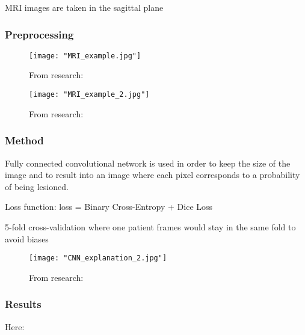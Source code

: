 MRI images are taken in the sagittal plane

\subsubsection{Preprocessing}

\begin{figure}[htbp]
	\centering
	\texttt{[image: "MRI\_example.jpg"]}
	\caption{From research: }
	\label{fig:res4:1}
\end{figure}

\begin{figure}[htbp]
	\centering
	\texttt{[image: "MRI\_example\_2.jpg"]}
	\caption{From research: }
	\label{fig:res4:2}
\end{figure}

\subsubsection{Method}

Fully connected convolutional network is used in order to keep the size of the image and to result into an image where each pixel corresponds to a probability of being lesioned.

Loss function: loss = Binary Cross-Entropy + Dice Loss

5-fold cross-validation where one patient frames would stay in the same fold to avoid biases

\begin{table}
	\centering
	\caption{Interesting values of }
\end{table}

\begin{figure}[htbp]
	\centering
	\texttt{[image: "CNN\_explanation\_2.jpg"]}
	\caption{From research: }
	\label{fig:res4:3}
\end{figure}

\subsubsection{Results}

Here: 

